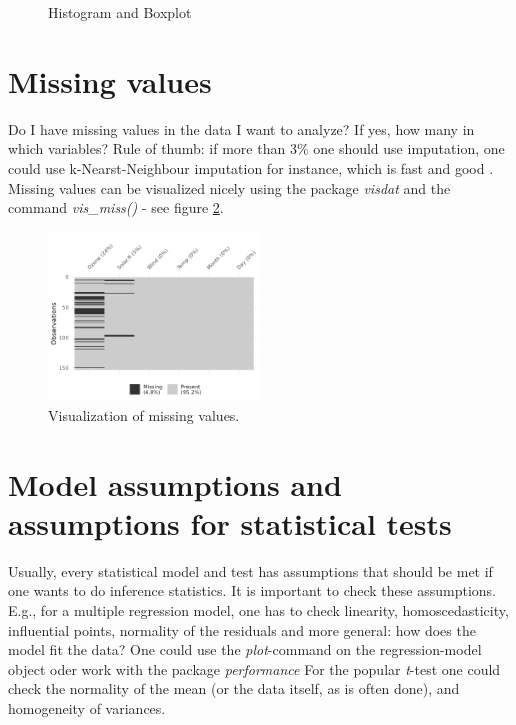 \documentclass[12pt,a4paper]{article}
\begin{document}
\begin{figure}[htbp]
\begin{minipage}[b]{0.45\textwidth}
    \caption{Histogram and Boxplot}
    \label{densityplot}
  \end{minipage}
\end{figure}

\section{Missing values}
Do I have missing values in the data I want to analyze? If yes, how many in which variables?
Rule of thumb: if more than 3\% one should use imputation, one could use k-Nearst-Neighbour imputation for instance, which is fast and good \cite{VIM}.
Missing values can be visualized nicely using the package \textit{visdat} \cite{visdat} and the command \textit{vis\_miss()} - see figure \ref{fig:vismiss}. 

\begin{figure}[h!]
  \centering
  \includegraphics[width=0.5\textwidth]{./images/vis_miss.png}
  \caption{Visualization of missing values.}
  \label{fig:vismiss}
\end{figure}

\section{Model assumptions and assumptions for statistical tests}
Usually, every statistical model and test has assumptions that should be met if one wants to do inference statistics. It is important to check these assumptions. E.g., for a multiple regression model, one has to check linearity, homoscedasticity, influential points, normality of the residuals and more general: how does the model fit the data?
One could use the \textit{plot}-command on the regression-model object oder work with the package \textit{performance} 
For the popular \textit{t}-test one could check the normality of the mean (or the data itself, as is often done), and homogeneity of variances.
\end{document}
